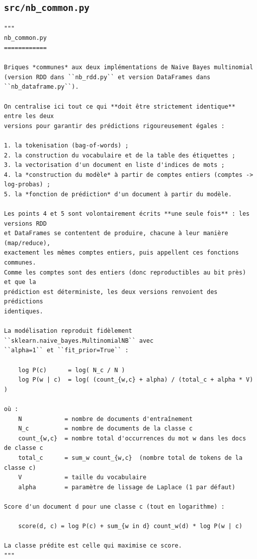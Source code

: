 \subsection{\texttt{src/nb\_common.py}}
\begin{lstlisting}[style=py]
"""
nb_common.py
============

Briques *communes* aux deux implémentations de Naive Bayes multinomial
(version RDD dans ``nb_rdd.py`` et version DataFrames dans ``nb_dataframe.py``).

On centralise ici tout ce qui **doit être strictement identique** entre les deux
versions pour garantir des prédictions rigoureusement égales :

1. la tokenisation (bag-of-words) ;
2. la construction du vocabulaire et de la table des étiquettes ;
3. la vectorisation d'un document en liste d'indices de mots ;
4. la *construction du modèle* à partir de comptes entiers (comptes -> log-probas) ;
5. la *fonction de prédiction* d'un document à partir du modèle.

Les points 4 et 5 sont volontairement écrits **une seule fois** : les versions RDD
et DataFrames se contentent de produire, chacune à leur manière (map/reduce),
exactement les mêmes comptes entiers, puis appellent ces fonctions communes.
Comme les comptes sont des entiers (donc reproductibles au bit près) et que la
prédiction est déterministe, les deux versions renvoient des prédictions
identiques.

La modélisation reproduit fidèlement ``sklearn.naive_bayes.MultinomialNB`` avec
``alpha=1`` et ``fit_prior=True`` :

    log P(c)      = log( N_c / N )
    log P(w | c)  = log( (count_{w,c} + alpha) / (total_c + alpha * V) )

où :
    N            = nombre de documents d'entraînement
    N_c          = nombre de documents de la classe c
    count_{w,c}  = nombre total d'occurrences du mot w dans les docs de classe c
    total_c      = sum_w count_{w,c}  (nombre total de tokens de la classe c)
    V            = taille du vocabulaire
    alpha        = paramètre de lissage de Laplace (1 par défaut)

Score d'un document d pour une classe c (tout en logarithme) :

    score(d, c) = log P(c) + sum_{w in d} count_w(d) * log P(w | c)

La classe prédite est celle qui maximise ce score.
"""


\end{lstlisting}
